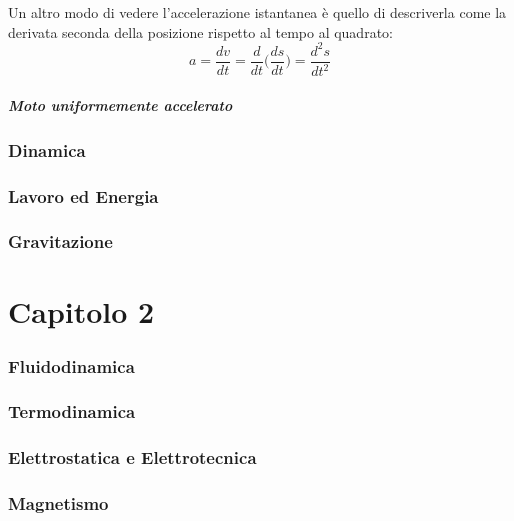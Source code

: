 \documentclass[11pt]{article}
\begin{document}
Un altro modo di vedere l'accelerazione istantanea è quello di descriverla come la derivata seconda della posizione rispetto al tempo al quadrato:
\begin{equation}
 a= \dfrac{dv}{dt}= \dfrac{d}{dt}\Bigg( \dfrac{ds}{dt}\Bigg) = \dfrac{d^2s}{dt^2}
 \end{equation} 

\subsubsection{Moto uniformemente accelerato}
\section{Dinamica}
\section{Lavoro ed Energia}
\section{Gravitazione}
\part{Capitolo 2}
\section{Fluidodinamica}

\section{Termodinamica}

\section{Elettrostatica e Elettrotecnica}

\section{Magnetismo}
\end{document}
